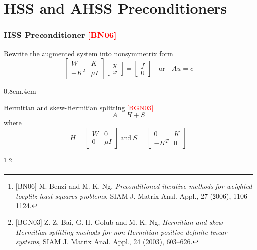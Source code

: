 \documentclass[11pt,compress,t]{beamer}
\newcommand{\Bullet}{{\fontsize{6pt}{6pt}\selectfont\CircleSolid}}
\newcommand{\zhu}{{\color{blue!40}\Bullet}}
\newcommand{\labeli}{\zhu}
\newenvironment{myitem}
  {\begin{list}{{\hfill\raisebox{0pt}{\labeli}}}{%
    \setlength{\leftmargin}{1.2em}\labelwidth0.8em\labelsep.4em%
    \itemsep0pt\parsep2pt\itemindent0pt\topsep0pt}}{\end{list}}
\newcommand{\bbm}{\begin{bmatrix}}
\newcommand{\ebm}{\end{bmatrix}}
\newcommand{\mycite}[1]{\textcolor{red}{\textrm{[#1]}}}
\begin{document}
\section{HSS and AHSS Preconditioners}
\begin{frame}
  \frametitle{HSS Preconditioner \mycite{BN06}}

  Rewrite the augmented system into nonsymmetrix form
      $$
        \bbm W & K \\ -K^T & \mu I \ebm \bbm y\\x\ebm = \bbm f\\ 0\ebm
        \quad\text{or}\quad
        Au=c
      $$

  \begin{myitem}
    \item Hermitian and skew-Hermitian splitting \mycite{BGN03}
      $$ A=H+S $$
      where
      $$
        H = \bbm W & 0\\ 0 & \mu I\ebm \ \text{and}\
        S = \bbm 0 & K\\ -K^T & 0 \ebm
      $$

  \end{myitem}

  \footnote{[BN06]
    M. Benzi and M. K. Ng,
    \emph{Preconditioned iterative methods for weighted toeplitz
       least squares problems},
    SIAM J. Matrix Anal. Appl., 27 (2006), 1106--1124. }
  \footnote{[BGN03]
    Z.-Z. Bai, G. H. Golub and M. K. Ng,
    \emph{Hermitian and skew-Hermitian splitting methods for
    non-Hermitian positive definite linear systems},
    SIAM J. Matrix Anal. Appl., 24 (2003), 603--626. }

\end{frame}
\end{document}
